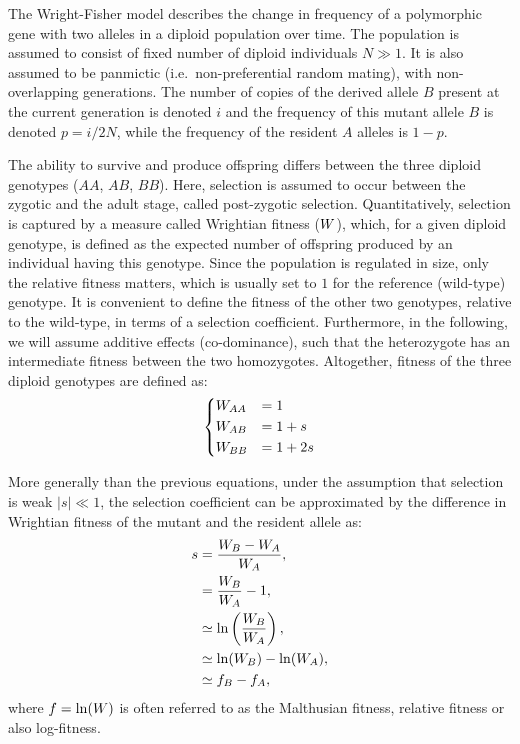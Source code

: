 The Wright-Fisher model describes the change in frequency of a \gls{polymorphic} gene with two \glspl{allele} in a diploid population over time.
The population is assumed to consist of fixed number of diploid individuals $N \gg 1$.
It is also assumed to be panmictic (i.e.~non-preferential random mating), with non-overlapping generations.
The number of copies of the derived \gls{allele} $B$ present at the current generation is denoted $i$ and the frequency of this mutant \gls{allele} $B$ is denoted $p = i/2N$, while the frequency of the resident $A$ \glspl{allele} is $1 - p$.

The ability to survive and produce offspring differs between the three diploid genotypes ($AA$, $AB$, $BB$).
Here, selection is assumed to occur between the zygotic and the adult stage, called post-zygotic selection.
Quantitatively, selection is captured by a measure called Wrightian fitness ($W$), which, for a given diploid genotype, is defined as the expected number of offspring produced by an individual having this genotype.
Since the population is regulated in size, only the relative fitness matters, which is usually set to $1$ for the reference (wild-type) genotype.
It is convenient to define the fitness of the other two genotypes, relative to the wild-type, in terms of a selection coefficient.
Furthermore, in the following, we will assume additive effects (co-dominance), such that the heterozygote has an intermediate fitness between the two homozygotes.
Altogether, fitness of the three diploid genotypes are defined as:
\begin{equation}
    \begin{dcases}
        W_{AA} & = 1 \\
        W_{AB} & = 1 + s \\
        W_{BB} & = 1 + 2s \\
    \end{dcases}
\end{equation}

More generally than the previous equations, under the assumption that selection is weak $|s| \ll 1$, the selection coefficient can be approximated by the difference in Wrightian fitness of the mutant and the resident \gls{allele} as:
\begin{align}
    s & = \dfrac{W_{B} - W_{A}}{W_{A}}, \\
    & = \dfrac{W_{B}}{W_{A}} - 1, \\
    & \simeq \ln\left( \dfrac{W_{B}}{W_{A}} \right), \\
    & \simeq \ln(W_{B}) - \ln(W_{A}), \\
    & \simeq f_{B} - f_{A},
\end{align}
where $f = \ln(W)$ is often referred to as the Malthusian fitness, relative fitness or also log-fitness.

